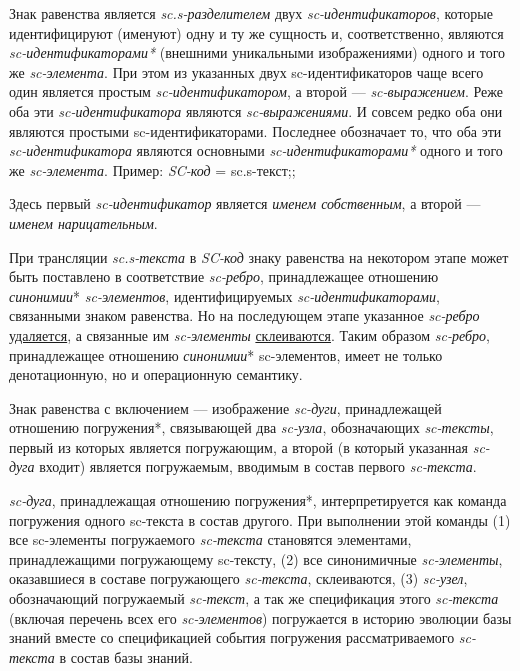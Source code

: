 Знак равенства является \textit{sc.s-разделителем} двух \textit{sc-идентификаторов}, которые идентифицируют (именуют) одну и ту же сущность и, соответственно, являются \textit{sc-идентификаторами*} (внешними уникальными изображениями) одного и того же \textit{sc-элемента}. При этом из указанных двух sc-идентификаторов чаще всего один является простым \textit{sc-идентификатором}, а второй --- \textit{sc-выражением}. Реже оба эти \textit{sc-идентификатора} являются \textit{sc-выражениями}. И совсем редко оба они являются простыми sc-идентификаторами. Последнее обозначает то, что оба эти \textit{sc-идентификатора} являются основными \textit{sc-идентификаторами*} одного и того же \textit{sc-элемента}. Пример:
\textit{SC-код} = sc.s-текст;;

Здесь первый \textit{sc-идентификатор} является \textit{именем собственным}, а второй --- \textit{именем нарицательным}.

При трансляции \textit{sc.s-текста} в \textit{SC-код} знаку равенства на некотором этапе может быть поставлено в соответствие \textit{sc-ребро}, принадлежащее отношению \textit{синонимии}* \textit{sc-элементов}, идентифицируемых \mbox{\textit{sc-идентификаторами}}, связанными знаком равенства. Но на последующем этапе указанное \textit{sc-ребро} \uline{удаляется}, а связанные им \textit{sc-элементы} \uline{склеиваются}. Таким образом \textit{sc-ребро}, принадлежащее отношению \textit{синонимии}* sc-элементов, имеет не только денотационную, но и операционную семантику.

Знак равенства с включением --- изображение \textit{sc-дуги}, принадлежащей отношению погружения*, связывающей два \textit{sc-узла}, обозначающих \textit{sc-тексты}, первый из которых является погружающим, а второй (в который указанная \textit{sc-дуга} входит) является погружаемым, вводимым в состав первого \textit{sc-текста}. 

\textit{sc-дуга}, принадлежащая отношению погружения*, интерпретируется как команда погружения одного sc-текста в состав другого. При выполнении этой команды (1) все sc-элементы погружаемого \textit{sc-текста} становятся элементами, принадлежащими погружающему sc-тексту, (2) все синонимичные \textit{sc-элементы}, оказавшиеся в составе погружающего \textit{sc-текста}, склеиваются, (3) \textit{sc-узел}, обозначающий погружаемый \textit{sc-текст}, а так же спецификация этого \textit{sc-текста} (включая перечень всех его \textit{sc-элементов}) погружается в историю эволюции базы знаний вместе со спецификацией события погружения рассматриваемого \textit{sc-текста} в состав базы знаний.

